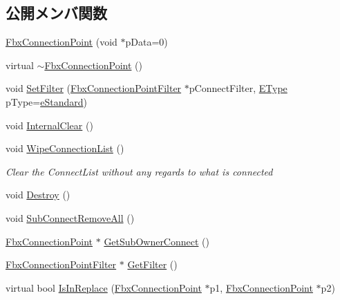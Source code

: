 \subsection*{公開メンバ関数}
\begin{DoxyCompactItemize}
\item 
\hyperlink{class_fbx_connection_point_ae226082145ad765084955854f7302698}{Fbx\+Connection\+Point} (void $\ast$p\+Data=0)
\item 
virtual \hyperlink{class_fbx_connection_point_a806c8989f3700242c2aa7b9ec74e7396}{$\sim$\+Fbx\+Connection\+Point} ()
\item 
void \hyperlink{class_fbx_connection_point_a06c3718eb58d2fb0c027bebc85a78753}{Set\+Filter} (\hyperlink{class_fbx_connection_point_filter}{Fbx\+Connection\+Point\+Filter} $\ast$p\+Connect\+Filter, \hyperlink{class_fbx_connection_point_a152767d2d289717698ab68d808f979b5}{E\+Type} p\+Type=\hyperlink{class_fbx_connection_point_a152767d2d289717698ab68d808f979b5af32832e57001937110a6f8b1c4ce1160}{e\+Standard})
\item 
void \hyperlink{class_fbx_connection_point_aadd7e4cb8e392a559373c72411df55bb}{Internal\+Clear} ()
\item 
void \hyperlink{class_fbx_connection_point_a9b1d6c109c6d2894aecbe9649660c4fd}{Wipe\+Connection\+List} ()
\begin{DoxyCompactList}\small\item\em Clear the Connect\+List without any regards to what is connected \end{DoxyCompactList}\item 
void \hyperlink{class_fbx_connection_point_a7876b4333d80ee35bef564a461b23003}{Destroy} ()
\item 
void \hyperlink{class_fbx_connection_point_aa5708ef478f7a32fcf0a74dc2d11ca90}{Sub\+Connect\+Remove\+All} ()
\item 
\hyperlink{class_fbx_connection_point}{Fbx\+Connection\+Point} $\ast$ \hyperlink{class_fbx_connection_point_a783e065e921f1e5e7b05b8108a450fb0}{Get\+Sub\+Owner\+Connect} ()
\item 
\hyperlink{class_fbx_connection_point_filter}{Fbx\+Connection\+Point\+Filter} $\ast$ \hyperlink{class_fbx_connection_point_aff0a1b385e12c2f785efd545d595709a}{Get\+Filter} ()
\item 
virtual bool \hyperlink{class_fbx_connection_point_a7be04c356de5cd97c7c3f1c63b2830f1}{Is\+In\+Replace} (\hyperlink{class_fbx_connection_point}{Fbx\+Connection\+Point} $\ast$p1, \hyperlink{class_fbx_connection_point}{Fbx\+Connection\+Point} $\ast$p2)

\end{DoxyCompactItemize}
